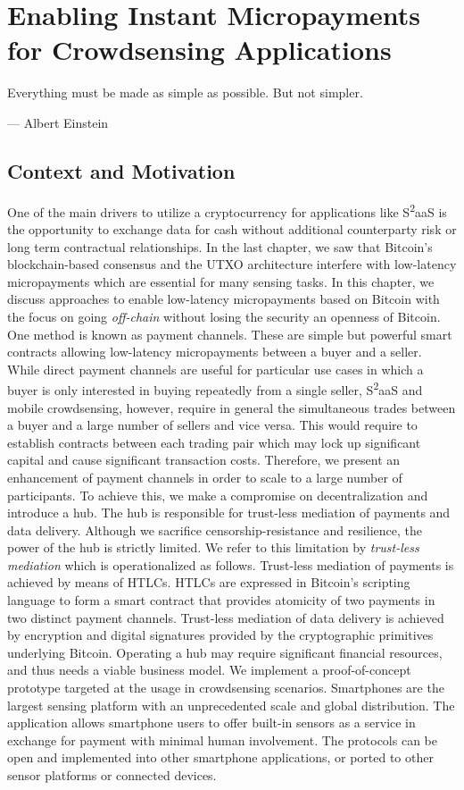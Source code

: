 \chapter{Enabling Instant Micropayments for Crowdsensing Applications}
\label{sec:goingoffchain}

\epigraph{Everything must be made as simple as possible. But not simpler.}{--- \textup{Albert Einstein}}


\section{Context and Motivation}

One of the main drivers to utilize a cryptocurrency for applications like S\textsuperscript{2}aaS is the opportunity to exchange data for cash without additional counterparty risk or long term contractual relationships. In the last chapter, we saw that Bitcoin's blockchain-based consensus and the \ac{UTXO} architecture interfere with low-latency micropayments which are essential for many sensing tasks. In this chapter, we discuss approaches to enable low-latency micropayments based on Bitcoin with the focus on going \emph{off-chain} without losing the security an openness of Bitcoin.
One method is known as payment channels. These are simple but powerful smart contracts allowing low-latency micropayments between a buyer and a seller. While direct payment channels are useful for particular use cases in which a buyer is only interested in buying repeatedly from a single seller, S\textsuperscript{2}aaS and mobile crowdsensing, however, require in general the simultaneous trades between a buyer and a large number of sellers and vice versa. This would require to establish contracts between each trading pair which may lock up significant capital and cause significant transaction costs. Therefore, we present an enhancement of payment channels in order to scale to a large number of participants. To achieve this, we make a compromise on decentralization and introduce a hub. The hub is responsible for trust-less mediation of payments and data delivery. Although we sacrifice censorship-resistance and resilience, the power of the hub is strictly limited. We refer to this limitation by \emph{trust-less mediation} which is operationalized as follows. Trust-less mediation of payments is achieved by means of \ac{HTLC}s. \ac{HTLC}s are expressed in Bitcoin's scripting language to form a smart contract that provides atomicity of two payments in two distinct payment channels. Trust-less mediation of data delivery is achieved by encryption and digital signatures provided by the cryptographic primitives underlying Bitcoin. Operating a hub may require significant financial resources, and thus needs a viable business model.
We implement a proof-of-concept prototype targeted at the usage in crowdsensing scenarios. Smartphones are the largest sensing platform with an unprecedented scale and global distribution. The application allows smartphone users to offer built-in sensors as a service in exchange for payment with minimal human involvement. The protocols can be open and implemented into other smartphone applications, or ported to other sensor platforms or connected devices.

